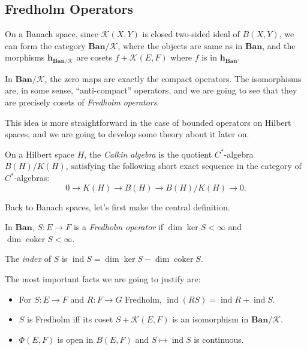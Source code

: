 \subsection{Fredholm Operators}

On a Banach space, since $\mathcal{K}(X,Y)$ is closed two-sided ideal of $B(X,Y)$, we can form the category $\mathbf{Ban}/\mathcal{K}$, where the objects are same as in $\mathbf{Ban}$, and the morphisms $\mathbf{h}_{\mathbf{Ban}/\mathcal{K}}$ are cosets $f + \mathcal{K}(E,F)$ where $f$ is in $\mathbf{h}_{\mathbf{Ban}}$.

In $\mathbf{Ban}/\mathcal{K}$, the zero maps are exactly the compact operators. The isomorphisms are, in some sense, ``anti-compact'' operators, and we are going to see that they are precisely cosets of \textit{Fredholm operators}.

This idea is more straightforward in the case of bounded operators on Hilbert spaces, and we are going to develop some theory about it later on.

\begin{definition}
	\label{defn:CalkinAlgebra}
	
	On a Hilbert space $H$, the \textit{Calkin algebra} is the quotient $C^*$-algebra $B(H) / K(H)$, satisfying the following short exact sequence in the category of $C^*$-algebras:
	\[
		0 \to K(H) \to B(H) \to B(H)/K(H) \to 0
	.\] 
\end{definition}

Back to Banach spaces, let's first make the central definition.

\begin{definition}
	\label{defn:FredholmOperator}
	In $\mathbf{Ban}$, $S: E \to F$ is a \textit{Fredholm operator} if  $\operatorname{dim} \operatorname{ker} S < \infty $ and $\operatorname{dim} \operatorname{coker} S < \infty $. 

	The \textit{index} of $S$ is $\operatorname{ind } S = \operatorname{dim} \operatorname{ker} S - \operatorname{dim} \operatorname{coker} S$.
\end{definition}

The most important facts we are going to justify are:
\begin{itemize}
	\item For $S: E \to F$ and $R: F \to G$ Fredholm, $\operatorname{ind}(RS) = \operatorname{ind } R + \operatorname{ind } S $.
	\item $S$ is Fredholm iff its coset $S + \mathcal{K}(E, F)$ is an isomorphism in $\mathbf{Ban}/\mathcal{K}$.
	\item $\Phi(E, F)$ is open in $B(E, F)$ and  $S \mapsto \operatorname{ind } S$ is continuous.
\end{itemize}

